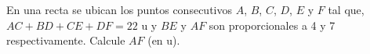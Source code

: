En una recta se ubican los puntos consecutivos $A$, $B$, $C$, $D$, $E$ y $F$ tal que,  $AC+BD+CE+DF=22$ u y $BE$ y $AF$ son proporcionales a 4 y 7 respectivamente.   Calcule $AF$ (en u).
